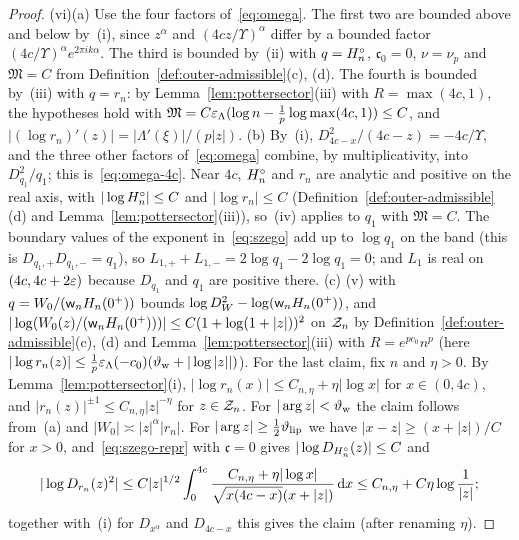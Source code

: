 \begin{proof}
(vi)(a) Use the four factors of~\eqref{eq:omega}. The first two are bounded above and below by~(i), since $z^\alpha$
and $(4cz/\Upsilon)^\alpha$ differ by a bounded factor $(4c/\Upsilon)^\alpha e^{2\pi ik\alpha}$. The third is bounded
by~(ii) with $q=H^{\circ}_n$, $\mathfrak c_0=0$, $\nu=\nu_p$ and $\mathfrak M=C$ from
Definition~\ref{def:outer-admissible}(c), (d). The fourth is bounded by~(iii) with $q=r_n$: by
Lemma~\ref{lem:pottersector}(iii) with $R=\max(4c,1)$, the hypotheses hold with
$\mathfrak M=C\varepsilon_\Lambda(\log n-\frac1p\log\max(4c,1))\le C$, and $|(\log r_n)'(z)|=|\Lambda'(\xi)|/(p|z|)$.
(b) By~(i), $D_{4c-x}^2/(4c-z)=-4c/\Upsilon$, and the three other factors of~\eqref{eq:omega} combine, by
multiplicativity, into $D_{q_1}^2/q_1$; this is~\eqref{eq:omega-4c}. Near $4c$, $H^{\circ}_n$ and $r_n$ are analytic and
positive on the real axis, with $|\log H^{\circ}_n|\le C$ and $|\log r_n|\le C$ (Definition~\ref{def:outer-admissible}(d) and
Lemma~\ref{lem:pottersector}(iii)), so~(iv) applies to $q_1$ with $\mathfrak M=C$. The boundary values of the exponent
in~\eqref{eq:szego} add up to $\log q_1$ on the band (this is $D_{q_1,+}D_{q_1,-}=q_1$), so
$L_{1,+}+L_{1,-}=2\log q_1-2\log q_1=0$; and $L_1$ is real on $(4c,4c+2\varepsilon)$ because $D_{q_1}$ and $q_1$ are positive
there.
(c) (v) with $q=W_0/(\mathsf w_n H_n(0^+))$ bounds $\log D_W^2-\log(\mathsf w_n H_n(0^+))$, and
$|\log(W_0(z)/(\mathsf w_n H_n(0^+)))|\le C(1+\log(1+|z|))^2$ on $\mathcal{Z}_n$ by Definition~\ref{def:outer-admissible}(c), (d) and
Lemma~\ref{lem:pottersector}(iii) with $R=e^{pc_0}n^p$ (here $|\log r_n(z)|\le\frac1p\varepsilon_\Lambda(-c_0)(\vartheta_{\mathrm{w}}+|\log|z||)$).
For the last claim, fix $n$ and $\eta>0$. By Lemma~\ref{lem:pottersector}(i),
$|\log r_n(x)|\le C_{n,\eta}+\eta|\log x|$ for $x\in(0,4c)$, and $|r_n(z)|^{\pm1}\le C_{n,\eta}|z|^{-\eta}$ for
$z\in\mathcal{Z}_n$. For $|\arg z|<\vartheta_{\mathrm{w}}$ the claim follows from~(a) and $|W_0|\asymp|z|^\alpha|r_n|$. For
$|\arg z|\ge\frac12\vartheta_{\mathrm{lip}}$ we have $|x-z|\ge(x+|z|)/C$ for $x>0$, and~\eqref{eq:szego-repr} with $\mathfrak c=0$ gives
$|\log D_{H^{\circ}_n}(z)|\le C$ and
\[
  |\log D_{r_n}(z)^2|\le C|z|^{1/2}\int_0^{4c}\frac{C_{n,\eta}+\eta|\log x|}{\sqrt{x(4c-x)}(x+|z|)}\,\mathrm{d} x\le C_{n,\eta}+C\eta\log\frac1{|z|};
\]
together with~(i) for $D_{x^\alpha}$ and $D_{4c-x}$ this gives the claim (after renaming $\eta$).
\end{proof}

